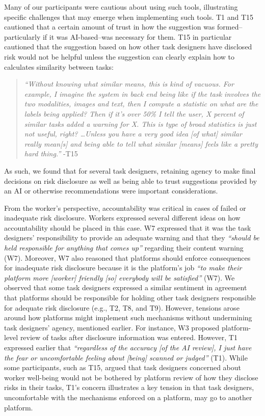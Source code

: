 Many of our participants were cautious about using such tools, illustrating specific challenges that may emerge when implementing such tools. T1 and T15 cautioned that a certain amount of trust in how the suggestion was formed--particularly if it was AI-based--was necessary for them. T15 in particular cautioned that the suggestion based on how other task designers have disclosed risk would not be helpful unless the suggestion can clearly explain how to calculates similarity between tasks: 
\begin{quote}
    \textit{``Without knowing what similar means, this is kind of vacuous. For example, I imagine the system in back end being like if the task involves the two modalities, images and text, then I compute a statistic on what are the labels being applied? Then if it's over 50\% I tell the user, X percent of similar tasks added a warning for X. This is type of broad statistics is just not useful, right? \dots Unless you have a very good idea [of what] similar really mean[s] and being able to tell what similar [means] feels like a pretty hard thing.''} -T15
\end{quote}
As such, we found that for several task designers, retaining agency to make final decisions on risk disclosure as well as being able to trust suggestions provided by an AI or otherwise recommendations were important considerations. 

From the worker's perspective, accountability was critical in cases of failed or inadequate risk disclosure. Workers expressed several different ideas on how accountability should be placed in this case. W7 expressed that it was the task designers' responsibility to provide an adequate warning and that they \textit{``should be held responsible for anything that comes up''} regarding their content warning (W7). Moreover, W7 also reasoned that platforms should enforce consequences for inadequate risk disclosure because it is the platform's job \textit{``to make their platform more [worker] friendly [so] everybody will be satisfied''} (W7). We observed that some task designers expressed a similar sentiment in agreement that platforms should be responsible for holding other task designers responsible for adequate risk disclosure (e.g., T2, T8, and T9). However, tensions arose around how platforms might implement such mechanisms without undermining task designers' agency, mentioned earlier. For instance, W3 proposed platform-level review of tasks after disclosure information was entered. However, T1 expressed earlier that \textit{``regardless of the accuracy [of the AI review], I just have the fear or uncomfortable feeling about [being] scanned or judged''} (T1). While some participants, such as T15, argued that task designers concerned about worker well-being would not be bothered by platform review of how they disclose risks in their tasks, T1's concern illustrates a key tension in that task designers, uncomfortable with the mechanisms enforced on a platform, may go to another platform. 

